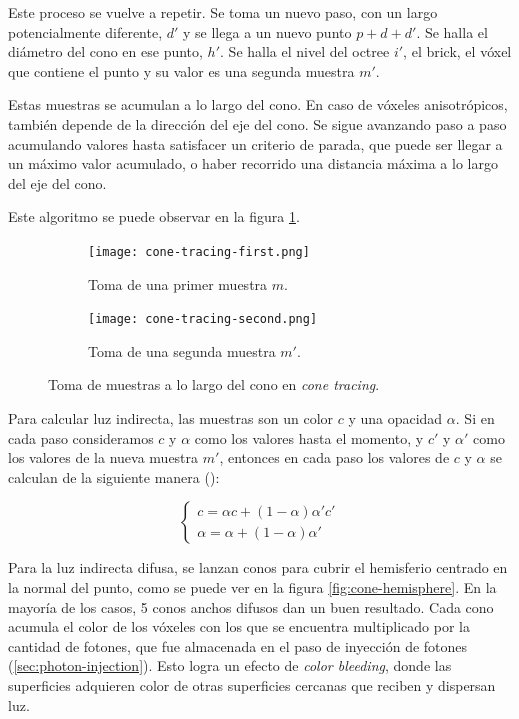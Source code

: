 Este proceso se vuelve a repetir.
Se toma un nuevo paso, con un largo potencialmente diferente, $d'$ y se llega a un nuevo punto $p + d + d'$.
Se halla el diámetro del cono en ese punto, $h'$.
Se halla el nivel del octree $i'$, el brick, el vóxel que contiene el punto y su valor es una segunda muestra $m'$.

Estas muestras se acumulan a lo largo del cono.
En caso de vóxeles anisotrópicos, también depende de la dirección del eje del cono.
Se sigue avanzando paso a paso acumulando valores hasta satisfacer un criterio de parada,
que puede ser llegar a un máximo valor acumulado, o haber recorrido una distancia máxima a lo largo del eje del cono.

Este algoritmo se puede observar en la figura \ref{fig:cone-tracing-sampling}.

\begin{figure}
    \begin{subfigure}{.49\textwidth}
        \centering
        \texttt{[image: cone-tracing-first.png]}
        \caption{Toma de una primer muestra $m$.}
    \end{subfigure}
    \begin{subfigure}{.49\textwidth}
        \centering
        \texttt{[image: cone-tracing-second.png]}
        \caption{Toma de una segunda muestra $m'$.}
    \end{subfigure}
    \caption{Toma de muestras a lo largo del cono en \textit{cone tracing}.}
    \label{fig:cone-tracing-sampling}
\end{figure}

Para calcular luz indirecta, las muestras son un color $c$ y una opacidad $\alpha$.
Si en cada paso consideramos $c$ y $\alpha$ como los valores hasta el momento, y $c'$ y $\alpha'$ como los valores de la nueva muestra $m'$, entonces en cada paso los valores de $c$ y $\alpha$ se calculan de la siguiente manera (\cite{voxel-cone-tracing}):

$$
\begin{cases}
    c = \alpha c + (1 - \alpha) \alpha' c' \\
    \alpha = \alpha + (1 - \alpha) \alpha'
\end{cases}
$$

Para la luz indirecta difusa, se lanzan conos para cubrir el hemisferio centrado en la normal del punto, como se puede ver en la figura \ref{fig:cone-hemisphere}.
En la mayoría de los casos, 5 conos anchos difusos dan un buen resultado.
Cada cono acumula el color de los vóxeles con los que se encuentra multiplicado por la cantidad de fotones, que fue almacenada en el paso de inyección de fotones (\ref{sec:photon-injection}).
Esto logra un efecto de \textit{color bleeding}, donde las superficies adquieren color de otras superficies cercanas que reciben y dispersan luz.

